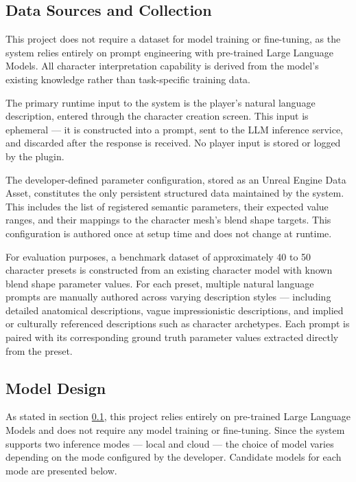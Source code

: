 \subsection{Data Sources and Collection}
\label{subsection:data-source-col}

This project does not require a dataset for model training or fine-tuning, as the system relies entirely on prompt engineering with pre-trained Large Language Models. All character interpretation capability is derived from the model's existing knowledge rather than task-specific training data.

The primary runtime input to the system is the player's natural language description, entered through the character creation screen. This input is ephemeral — it is constructed into a prompt, sent to the LLM inference service, and discarded after the response is received. No player input is stored or logged by the plugin.

The developer-defined parameter configuration, stored as an Unreal Engine Data Asset, constitutes the only persistent structured data maintained by the system. This includes the list of registered semantic parameters, their expected value ranges, and their mappings to the character mesh's blend shape targets. This configuration is authored once at setup time and does not change at runtime.

For evaluation purposes, a benchmark dataset of approximately 40 to 50 character presets is constructed from an existing character model with known blend shape parameter values. For each preset, multiple natural language prompts are manually authored across varying description styles — including detailed anatomical descriptions, vague impressionistic descriptions, and implied or culturally referenced descriptions such as character archetypes. Each prompt is paired with its corresponding ground truth parameter values extracted directly from the preset. 

\newpage

\subsection{Model Design}


As stated in section \ref{subsection:data-source-col}, this project relies entirely on pre-trained Large Language Models and does not require any model training or fine-tuning. Since the system supports two inference modes — local and cloud — the choice of model varies depending on the mode configured by the developer. Candidate models for each mode are presented below.

